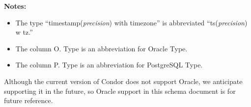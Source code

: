 \newcommand{\cd}{{C}ondor}
\newcommand{\qp}{{Q}uill}
\newcommand{\ca}{{C}lass{A}d}
\newcommand{\cas}{{C}lass{A}ds}
\newcommand{\pg}{{P}ostgre{SQL}}
\newcommand{\oc}{{O}racle}
\newcommand{\db}{{D}bmsd}

\noindent \textbf{Notes:}
\begin{itemize}
\item The type ``timestamp(\textit{precision}) with timezone'' is
abbreviated ``ts(\textit{precision}) w tz.''
\item The column O. Type is an abbreviation for Oracle Type.
\item The column P. Type is an abbreviation for {PostgreSQL} Type.
\end{itemize}
Although the current version of Condor does not support Oracle, we
anticipate supporting it in the future, so Oracle support in this
schema document is for future reference.
\vspace{24pt}

